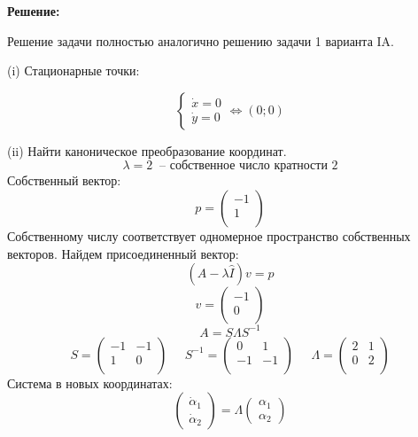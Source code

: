 \documentclass[a4paper, 12pt]{article}
\begin{document}
\textbf{Решение:} \par
Решение задачи полностью аналогично решению задачи 1 варианта IA.  

(i) Стационарные точки:

\[
\left\{
\begin{array}{lr}
\dot{x} = 0\\
\dot{y} = 0
\end{array}
\right.
\Leftrightarrow (0;0)
\]


(ii) Найти каноническое преобразование координат.
\[\lambda =2\;\;\text{-- собственное число кратности 2}\]
Собственный вектор:
\[p=
\left(
\begin{array}{cc}
-1\\
1\\
\end{array}
\right)
\]
Собственному числу соответствует одномерное пространство собственных векторов. Найдем присоединенный вектор:\\
\[(A-\lambda \hat{I})v=p\]
\[v=
\left(
\begin{array}{cc}
-1\\
0\\
\end{array}
\right)
\]
\[A = S\Lambda S^{-1}\]
\[
S = \left(
\begin{array}{cc}
-1 & -1\\
1 & 0\\
\end{array}
\right)\;\;\;\;\;
S^{-1} = \left(
\begin{array}{cc}
0 & 1\\
-1 & -1\\
\end{array}\right)\;\;\;\;\;
\Lambda = \left(
\begin{array}{cc}
2 & 1\\
0 & 2\\
\end{array}\right)
\]
Система в новых координатах:
\[\left(
\begin{array}{c}
\dot{\alpha}_1\\
\dot{\alpha}_2
\end{array}
\right)=\Lambda\left(
\begin{array}{c}
{\alpha}_1 \\
{\alpha}_2
\end{array}
\right)\]
\end{document}
